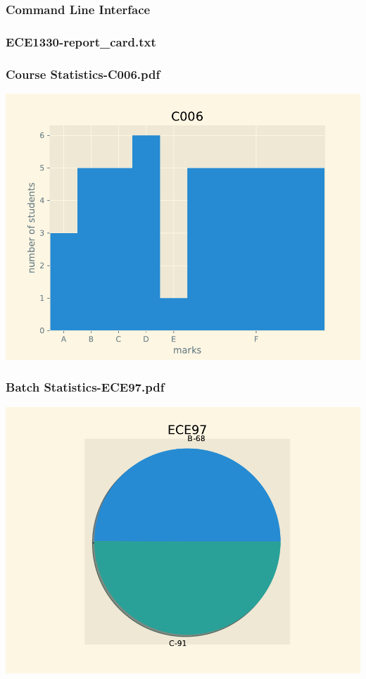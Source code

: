 \subsubsection*{Command Line Interface}
\subsubsection*{ECE1330-report\_card.txt}
\fontsize{12pt}{\baselineskip}\selectfont
{}
 \fontsize{14pt}{\baselineskip}\selectfont
\subsubsection*{Course Statistics-C006.pdf}
\includegraphics{outputs/Course Statistics-C006.pdf}
\subsubsection*{Batch Statistics-ECE97.pdf}
\includegraphics{outputs/Batch Statistics-ECE97.pdf}

